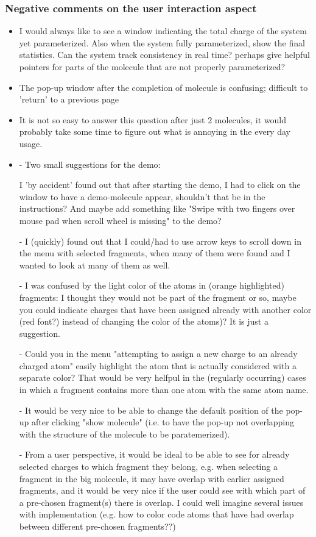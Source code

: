 \subsubsection{Negative comments on the user interaction aspect}
\begin{itemize}
\item I would always like to see a window indicating the total charge of the system yet parameterized. Also when the system fully parameterized, show the final statistics. Can the system track consistency in real time? perhaps give helpful pointers for parts of the molecule that are not properly parameterized? 

\item The pop-up window after the completion of molecule is confusing; difficult to 'return' to a previous page

\item It is not so easy to answer this question after just 2 molecules, it would probably take some time to figure out what is annoying in the every day usage.

\item - Two small suggestions for the demo:

 I 'by accident' found out that after starting the demo, I had to click on the window to have a demo-molecule appear, shouldn't that be in the instructions? And maybe add something like "Swipe with two fingers over mouse pad when scroll wheel is missing" to the demo?

-  I (quickly) found out that I could/had to use arrow keys to scroll down in the menu with selected fragments, when many of them were found and I wanted to look at many of them as well.

-  I was confused by the light color of the atoms in (orange highlighted) fragments: I thought they would not be part of the fragment or so, maybe you could indicate charges that have been assigned already with another color (red font?) instead of changing the color of the atoms)? It is just a suggestion.

- Could you in the menu "attempting to assign a new charge to an already charged atom"  easily highlight the atom that is actually considered with a separate color? That would be very helfpul in the (regularly occurring) cases in which a fragment contains more than one atom with the same atom name.

- It would be very nice to be able to change the default position of the pop-up after clicking "show molecule" (i.e. to have the pop-up not overlapping with the structure of the molecule to be paratemerized).

- From a user perspective, it would be ideal to be able to see for already selected charges to which fragment they belong, e.g. when selecting a fragment in the big molecule, it may have overlap with earlier assigned fragments, and it would be very nice if the user could see with which part of a pre-chosen fragment(s) there is overlap. I could well imagine several issues with implementation (e.g. how to color code atoms that have had overlap between different pre-chosen fragments??)

\end{itemize}



